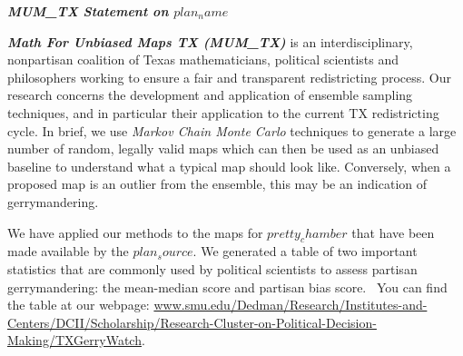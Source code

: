 \documentclass[letterpaper]{article}
\title{}
\author{Barreiro, Andrea}
\newcommand\textstyleInternetlink[1]{\textcolor[rgb]{0.019607844,0.3882353,0.75686276}{#1}}
\newcommand{\VAR}[1] {$#1$}
\begin{document}
\textbf{\textit{MUM\_TX Statement on \VAR{plan_name}}}

\bigskip

\textbf{\textit{Math For Unbiased Maps TX (MUM\_TX) }}is\textbf{\textit{ }}an interdisciplinary, nonpartisan coalition
of Texas mathematicians, political scientists and philosophers working to ensure a fair and transparent redistricting
process. Our research concerns the development and application of ensemble sampling techniques, and in particular their
application to the current TX redistricting cycle. In brief, we use \textit{Markov Chain Monte Carlo }techniques to
generate a large number of random, legally valid maps which can then be used as an unbiased baseline to understand what
a typical map should look like. Conversely, when a proposed map is an outlier from the ensemble, this may be an
indication of gerrymandering.

\bigskip

We have applied our methods to the maps for \VAR{pretty_chamber} that have been made available by the \VAR{plan_source}. 
We generated a table of two important statistics that are commonly used by political scientists to assess
partisan gerrymandering: the mean-median score and partisan bias score. \ You can find the table at our webpage:
\href{http://www.smu.edu/Dedman/Research/Institutes-and-Centers/DCII/Scholarship/Research-Cluster-on-Political-Decision-Making/TXGerryWatch}{\textstyleInternetlink{www.smu.edu/Dedman/Research/Institutes-and-Centers/DCII/Scholarship/Research-Cluster-on-Political-Decision-Making/TXGerryWatch}}.

\end{document}
